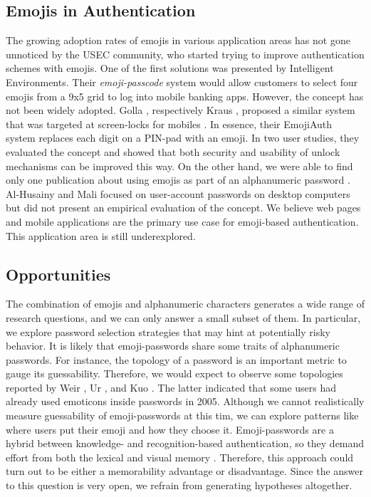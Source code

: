 \subsection{Emojis in Authentication}
The growing adoption rates of emojis in various application areas has not gone unnoticed by the \gls{USEC} community, who started trying to improve authentication schemes with emojis. One of the first solutions was presented by Intelligent Environments. Their \textit{emoji-passcode} system would allow customers to select four emojis from a 9x5 grid to log into mobile banking apps. However, the concept has not been widely adopted. Golla \etal, respectively Kraus \etal, proposed a similar system that was targeted at screen-locks for mobiles \cite{Golla2017EmojiAuth, Kraus2017Emoji}. In essence, their EmojiAuth system replaces each digit on a PIN-pad with an emoji. In two user studies, they evaluated the concept and showed that both security and usability of unlock mechanisms can be improved this way. On the other hand, we were able to find only one publication about using emojis as part of an alphanumeric password  \cite{AlHusainy2015EmojiPasswords}. Al-Husainy and Mali focused on user-account passwords on desktop computers but did not present an empirical evaluation of the concept. We believe web pages and mobile applications are the primary use case for emoji-based authentication. This application area is still underexplored. 

\subsection{Opportunities}
The combination of emojis and alphanumeric characters generates a wide range of research questions, and we can only answer a small subset of them. In particular, we explore password selection strategies that may hint at potentially risky behavior. It is likely that emoji-passwords share some traits of alphanumeric passwords. For instance, the topology of a password is an important metric to gauge its guessability. Therefore, we would expect to observe some topologies reported by Weir \etal  \cite{Weir2010MetricsPolicies}, Ur \etal \cite{Ur2015PWCreationLab}, and Kuo \etal \cite{Kuo2006HumanSelectionMnemonic}. The latter indicated that some users had already used emoticons inside passwords in 2005. Although we cannot realistically measure guessability of emoji-passwords at this tim, we can explore patterns like where users put their emoji and how they choose it. Emoji-passwords are a hybrid between knowledge- and recognition-based authentication, so they demand effort from both the lexical and visual memory \cite{Renaud2009VisualSnakeOil}. Therefore, this approach could turn out to be either a memorability advantage or disadvantage. Since the answer to this question is very open, we refrain from generating hypotheses altogether.

